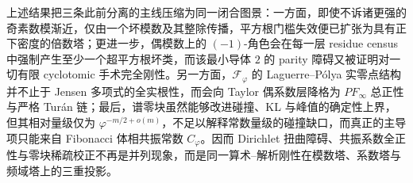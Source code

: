 

\noindent
上述结果把三条此前分离的主线压缩为同一闭合图景：一方面，即使不诉诸更强的奇素数模渐近，仅由一个坏模数及其整除传播，平方根门槛失效便已扩张为具有正下密度的倍数塔；更进一步，偶模数上的 \((-1)\)-角色会在每一层 residue census 中强制产生至少一个超平方根坏类，而该最小导体 \(2\) 的 parity 障碍又被证明对一切有限 cyclotomic 手术完全刚性。另一方面，\(\mathcal F_\varphi\) 的 Laguerre--P\'olya 实零点结构并不止于 Jensen 多项式的全实根性，而会向 Taylor 偶系数层降格为 \(PF_\infty\) 总正性与严格 Tur\'an 链；最后，谱零块虽然能够改进碰撞、KL 与峰值的确定性上界，但其相对量级仅为 \(\varphi^{-m/2+o(m)}\)，不足以解释常数量级的碰撞缺口，而真正的主导项只能来自 Fibonacci 体相共振常数 \(C_\varphi\)。因而 Dirichlet 扭曲障碍、共振系数全正性与零块稀疏校正不再是并列现象，而是同一算术--解析刚性在模数塔、系数塔与频域塔上的三重投影。

\endinput

